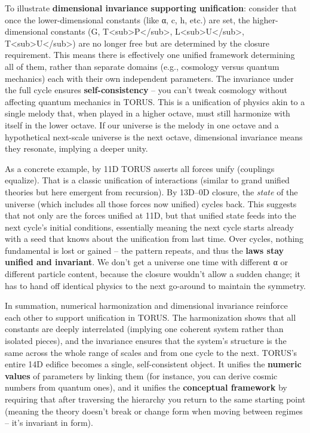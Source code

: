 To illustrate \textbf{dimensional invariance supporting unification}:
consider that once the lower-dimensional constants (like α, c, h, etc.)
are set, the higher-dimensional constants (G,
T\textless{}sub\textgreater{}P\textless{}/sub\textgreater{},
L\textless{}sub\textgreater{}U\textless{}/sub\textgreater{},
T\textless{}sub\textgreater{}U\textless{}/sub\textgreater{}) are no
longer free but are determined by the closure requirement​. This means
there is effectively one unified framework determining all of them,
rather than separate domains (e.g., cosmology versus quantum mechanics)
each with their own independent parameters. The invariance under the
full cycle ensures \textbf{self-consistency} -- you can't tweak
cosmology without affecting quantum mechanics in TORUS. This is a
unification of physics akin to a single melody that, when played in a
higher octave, must still harmonize with itself in the lower octave. If
our universe is the melody in one octave and a hypothetical next-scale
universe is the next octave, dimensional invariance means they resonate,
implying a deeper unity.

As a concrete example, by 11D TORUS asserts all forces unify (couplings
equalize)​. That is a classic unification of interactions (similar to
grand unified theories but here emergent from recursion). By 13D--0D
closure, the \emph{state} of the universe (which includes all those
forces now unified) cycles back. This suggests that not only are the
forces unified at 11D, but that unified state feeds into the next
cycle's initial conditions, essentially meaning the next cycle starts
already with a seed that knows about the unification from last time.
Over cycles, nothing fundamental is lost or gained -- the pattern
repeats, and thus the \textbf{laws stay unified and invariant}. We don't
get a universe one time with different α or different particle content,
because the closure wouldn't allow a sudden change; it has to hand off
identical physics to the next go-around to maintain the symmetry.

In summation, numerical harmonization and dimensional invariance
reinforce each other to support unification in TORUS. The harmonization
shows that all constants are deeply interrelated (implying one coherent
system rather than isolated pieces), and the invariance ensures that the
system's structure is the same across the whole range of scales and from
one cycle to the next. TORUS's entire 14D edifice becomes a single,
self-consistent object. It unifies the \textbf{numeric values} of
parameters by linking them (for instance, you can derive cosmic numbers
from quantum ones), and it unifies the \textbf{conceptual framework} by
requiring that after traversing the hierarchy you return to the same
starting point (meaning the theory doesn't break or change form when
moving between regimes -- it's invariant in form).

